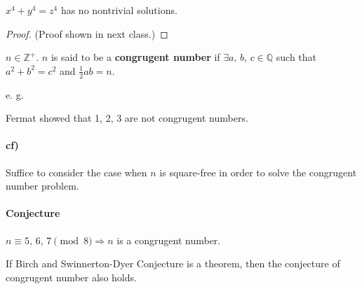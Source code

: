 \begin{theorem}
    $x^4+y^4=z^4$ has no nontrivial solutions.
\end{theorem}

\begin{proof}
    (Proof shown in next class.)
\end{proof}

\begin{definition}
    $n \in \mathbb{Z}^+$. $n$ is said to be a \textbf{congrugent number}
    if $\exists a,\,b,\,c \in \mathbb{Q}$ such that $a^2+b^2=c^2$ and $\frac{1}{2}ab=n$.
\end{definition}

e. g. 

\begin{center}
\end{center}

\begin{center}
\end{center}

Fermat showed that 1, 2, 3 are not congrugent numbers.

\paragraph{cf)} Suffice to consider the case when $n$ is square-free
in order to solve the congrugent number problem.

\paragraph{Conjecture} $n\equiv 5,\,6,\,7\pmod{8}\Rightarrow n$
is a congrugent number.

\begin{remark}
    If Birch and Swinnerton-Dyer Conjecture is a theorem,
    then the conjecture of congrugent number also holds.
\end{remark}

